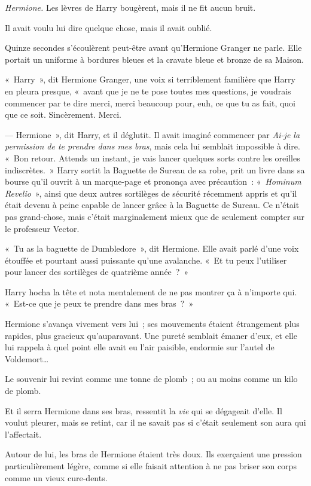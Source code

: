 \emph{Hermione.} Les lèvres de Harry bougèrent, mais il ne fit aucun bruit.

Il avait voulu lui dire quelque chose, mais il avait oublié.

Quinze secondes s'écoulèrent peut-être avant qu'Hermione Granger ne parle. Elle portait un uniforme à bordures bleues et la cravate bleue et bronze de sa Maison.

«~Harry~», dit Hermione Granger, une voix si terriblement familière que Harry en pleura presque, «~avant que je ne te pose toutes mes questions, je voudrais commencer par te dire merci, merci beaucoup pour, euh, ce que tu as fait, quoi que ce soit. Sincèrement. Merci.

--- Hermione~», dit Harry, et il déglutit. Il avait imaginé commencer par \emph{Ai-je la permission de te prendre dans mes bras}, mais cela lui semblait impossible à dire. «~Bon retour. Attends un instant, je vais lancer quelques sorts contre les oreilles indiscrètes.~» Harry sortit la Baguette de Sureau de sa robe, prit un livre dans sa bourse qu'il ouvrit à un marque-page et prononça avec précaution~: «~\emph{Hominum Revelio}~», ainsi que deux autres sortilèges de sécurité récemment appris et qu'il était devenu à peine capable de lancer grâce à la Baguette de Sureau. Ce n'était pas grand-chose, mais c'était marginalement mieux que de seulement compter sur le professeur Vector.

«~Tu as la baguette de Dumbledore~», dit Hermione. Elle avait parlé d'une voix étouffée et pourtant aussi puissante qu'une avalanche. «~Et tu peux l'utiliser pour lancer des sortilèges de quatrième année~?~»

Harry hocha la tête et nota mentalement de ne pas montrer ça à n'importe qui. «~Est-ce que je peux te prendre dans mes bras~?~»

Hermione s'avança vivement vers lui~; ses mouvements étaient étrangement plus rapides, plus gracieux qu'auparavant. Une pureté semblait émaner d'eux, et elle lui rappela à quel point elle avait eu l'air paisible, endormie sur l'autel de Voldemort…

Le souvenir lui revint comme une tonne de plomb~; ou au moins comme un kilo de plomb.

Et il serra Hermione dans ses bras, ressentit la \emph{vie} qui se dégageait d'elle. Il voulut pleurer, mais se retint, car il ne savait pas si c'était seulement son aura qui l'affectait.

Autour de lui, les bras de Hermione étaient très doux. Ils exerçaient une pression particulièrement légère, comme si elle faisait attention à ne pas briser son corps comme un vieux cure-dents.

